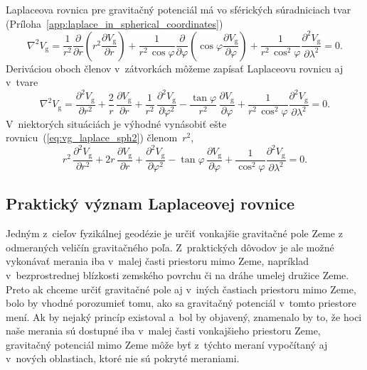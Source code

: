 \documentclass[a4paper, 12pt]{book}
\newcommand{\gidx}{\mathrm g}
\begin{document}
Laplaceova rovnica pre gravitačný potenciál má vo sférických súradniciach tvar 
(Príloha~\ref{app:laplace_in_spherical_coordinates})
%
\begin{equation}
\label{eq:vg_laplace_sph}
\nabla^2 V_\gidx = \frac{1}{r^2} \frac{\partial}{\partial r} \left( r^2 
\frac{\partial V_\gidx}{\partial r} \right) + \frac{1}{r^2 \, \cos\varphi} 
\frac{\partial}{\partial \varphi} \left( \cos\varphi \frac{\partial 
V_\gidx}{\partial \varphi} \right) + \frac{1}{r^2 \, 
\cos^2\varphi}\frac{\partial^2 V_\gidx}{\partial \lambda^2} = 0{.}
\end{equation}
%
Deriváciou oboch členov v~zátvorkách môžeme zapísať Laplaceovu rovnicu aj 
v~tvare
%
\begin{equation}
\label{eq:vg_laplace_sph2}
\nabla^2 V_\gidx = \frac{\partial^2 V_\gidx}{\partial r^2} + \frac{2}{r} \, 
\frac{\partial V_\gidx}{\partial r} + \frac{1}{r^2} \, \frac{\partial^2 
V_\gidx}{\partial \varphi^2} - \frac{\tan\varphi}{r^2} \, \frac{\partial 
V_\gidx}{\partial \varphi} + \frac{1}{r^2 \,
\cos^2\varphi}\frac{\partial^2 V_\gidx}{\partial \lambda^2} = 0{.}
\end{equation}
%
V~niektorých situáciách je výhodné vynásobiť ešte 
rovnicu~(\ref{eq:vg_laplace_sph2}) členom~$r^2$,
%
\begin{equation}
\label{eq:vg_laplace_sph3}
r^2 \, \frac{\partial^2 V_\gidx}{\partial r^2} + 2r \, \frac{\partial 
V_\gidx}{\partial r} + \frac{\partial^2 V_\gidx}{\partial \varphi^2} 
- \tan\varphi \, \frac{\partial V_\gidx}{\partial \varphi} 
+ \frac{1}{\cos^2\varphi}\frac{\partial^2 V_\gidx}{\partial \lambda^2} = 0{.}
\end{equation}



\subsection{Praktický význam Laplaceovej rovnice}
\label{sec:meaning_of_laplace_equation_in_practice}

Jedným z~cieľov fyzikálnej geodézie je určiť vonkajšie gravitačné pole Zeme 
z odmeraných veličín gravitačného poľa.  Z~praktických dôvodov je ale možné 
vykonávať merania iba v~malej časti priestoru mimo Zeme, napríklad 
v~bezprostrednej blízkosti zemského povrchu či na dráhe umelej družice Zeme.  
Preto ak chceme určiť gravitačné pole aj v~iných častiach priestoru mimo Zeme, 
bolo by vhodné porozumieť tomu, ako sa gravitačný potenciál v~tomto priestore 
mení.  Ak by nejaký princíp existoval a~bol by objavený, znamenalo by to, že 
hoci naše merania sú dostupné iba v~malej časti vonkajšieho priestoru Zeme, 
gravitačný potenciál mimo Zeme môže byť z~týchto meraní vypočítaný aj v~nových 
oblastiach, ktoré nie sú pokryté meraniami.
\end{document}

